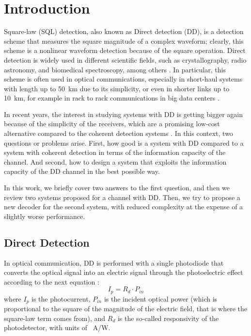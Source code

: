 \chapter{Introduction}
\label{ch:introduction}
\newcommand{\IntroImage}[1]{images/intro/#1}


	

Square-law (SQL) detection, also known as Direct detection (DD), is a detection scheme that measures the square magnitude of a complex waveform; clearly, this scheme is a nonlinear waveform detection because of the square operation. Direct detection is widely used in different scientific fields, such as crystallography, radio astronomy, and biomedical spectroscopy, among others \cite{Tasbihi_Tukey}. In particular, this scheme is often used in optical communications, especially in short-haul systems with length up to \SI{50}{\km} \cite{Agrawal_ch1} due to its simplicity, or even in shorter links up to \SI{10}{\km}, for example in rack to rack communications in big data centers \cite{Tasbihi_Tukey}.

In recent years, the interest in studying systems with DD is getting bigger again because of the simplicity of the receivers, which are a promising low-cost alternative compared to the coherent detection systems \cite{Mecozzi_2018}. In this context, two questions or problems arise. First, how good is a system with DD compared to a system with coherent detection in terms of the information capacity of the channel. And second, how to design a system that exploits the information capacity of the DD channel in the best possible way.

In this work, we briefly cover two answers to the first question, and then we review two systems proposed for a channel with DD. Then, we try to propose a new decoder for the second system, with reduced complexity at the expense of a slightly worse performance.


\section{Direct Detection}
\label{sec:Direct_Detection}

In optical communication, DD is performed with a single photodiode that converts the optical signal into an electric signal through the photoelectric effect according to the next equation \cite{Agrawal_ch4}:
\begin{equation}
I_p = R_d\cdot P_{in}
\label{eq:photocurrent}
\end{equation}
where $I_p$ is the photocurrent, $P_{in}$ is the incident optical power (which is proportional to the square of the magnitude of the electric field, that is where the square-law term comes from), and $R_d$ is the so-called responsivity of the photodetector, with units of \SI{}{\A/\W}.

